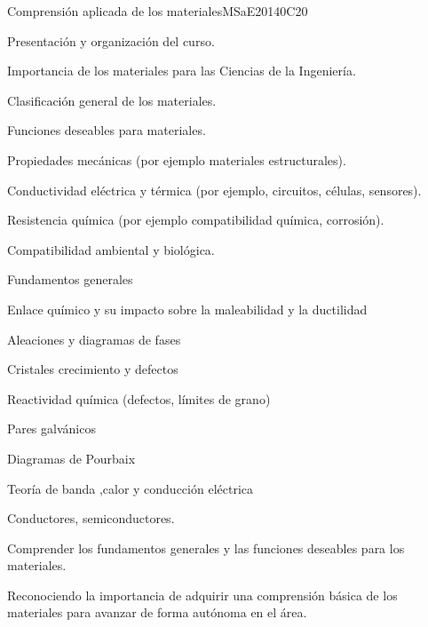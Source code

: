 \begin{syllabus}
\begin{unit}{Comprensión aplicada de los materiales}{}{MSaE2014}{0}{C20}
\begin{topics}
      \item Presentación y organización del curso.
      \item Importancia de los materiales para las Ciencias de la Ingeniería.
      \item Clasificación general de los materiales.
      \item Funciones deseables para materiales.
	  \begin{subtopics}
	      \item Propiedades mecánicas (por ejemplo materiales estructurales).
	      \item Conductividad eléctrica y térmica (por ejemplo, circuitos, células, sensores).
	      \item Resistencia química (por ejemplo compatibilidad química, corrosión).
	      \item Compatibilidad ambiental y biológica.
	  \end{subtopics}
      \item Fundamentos generales
	  \begin{subtopics}
	      \item Enlace químico y su impacto sobre la maleabilidad y la ductilidad
	      \item Aleaciones y diagramas de fases
	      \item Cristales crecimiento y defectos
	      \item Reactividad química (defectos, límites de grano)
	      \item Pares galvánicos
	      \item Diagramas de Pourbaix
	      \item Teoría de banda ,calor y conducción eléctrica
	      \item Conductores, semiconductores.
	  \end{subtopics}      
\end{topics}
   \begin{learningoutcomes}
    \item Comprender los fundamentos generales y las funciones deseables para los materiales.
    \item Reconociendo la importancia de adquirir una comprensión básica de los materiales para avanzar de forma autónoma en el área.
   \end{learningoutcomes}
\end{unit}


\end{syllabus}
